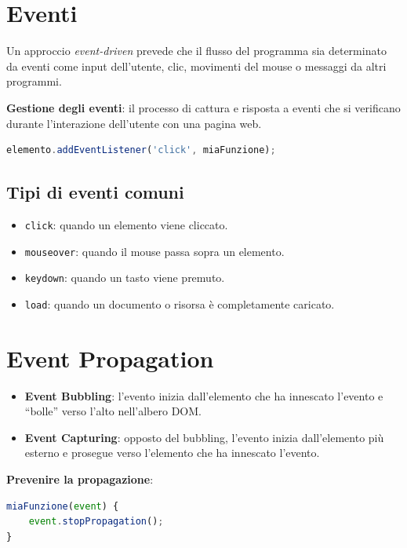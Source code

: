 \section{Eventi}

Un approccio \textit{event-driven} prevede che il flusso del programma sia determinato da eventi come input dell'utente, clic, movimenti del mouse o messaggi da altri programmi.

\textbf{Gestione degli eventi}: il processo di cattura e risposta a eventi che si verificano durante l'interazione dell'utente con una pagina web.

\begin{lstlisting}[language=JavaScript]
elemento.addEventListener('click', miaFunzione);
\end{lstlisting}

\subsection{Tipi di eventi comuni}

\begin{itemize}
    \item \texttt{click}: quando un elemento viene cliccato.
    \item \texttt{mouseover}: quando il mouse passa sopra un elemento.
    \item \texttt{keydown}: quando un tasto viene premuto.
    \item \texttt{load}: quando un documento o risorsa è completamente caricato.
\end{itemize}

\section{Event Propagation}

\begin{itemize}
    \item \textbf{Event Bubbling}: l'evento inizia dall'elemento che ha innescato l'evento e ``bolle'' verso l'alto nell'albero DOM.
    \item \textbf{Event Capturing}: opposto del bubbling, l'evento inizia dall'elemento più esterno e prosegue verso l'elemento che ha innescato l'evento.
\end{itemize}

\textbf{Prevenire la propagazione}:
\begin{lstlisting}[language=JavaScript]
miaFunzione(event) {
    event.stopPropagation();
}
\end{lstlisting}

